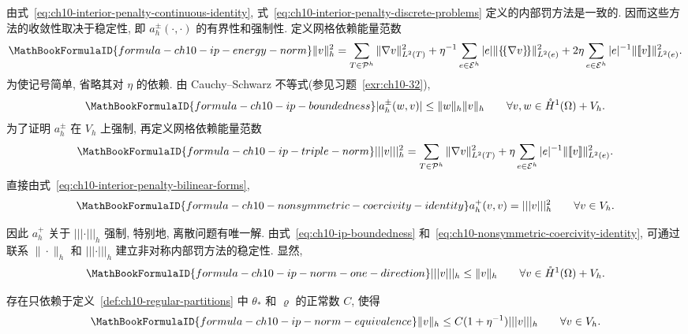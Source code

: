 由式~\eqref{eq:ch10-interior-penalty-continuous-identity}, 式~\eqref{eq:ch10-interior-penalty-discrete-problems} 定义的内部罚方法是一致的. 因而这些方法的收敛性取决于稳定性, 即 $a_h^\pm(\cdot,\cdot)$ 的有界性和强制性. 定义网格依赖能量范数
\begin{equation}
\MathBookFormulaID{formula-ch10-ip-energy-norm}
\label{eq:ch10-ip-energy-norm}
\|v\|_h^2
=\sum_{T\in\mathcal P^h}\|\nabla v\|_{L^2(T)}^2
+\eta^{-1}\sum_{e\in\mathcal E^h}|e|\|\{\!\{\nabla v\}\!\}\|_{L^2(e)}^2
+2\eta\sum_{e\in\mathcal E^h}|e|^{-1}\|[\![v]\!]\|_{L^2(e)}^2.
\end{equation}
为使记号简单, 省略其对 $\eta$ 的依赖. 由 Cauchy--Schwarz 不等式(参见习题~\ref{exr:ch10-32}),
\begin{equation}
\MathBookFormulaID{formula-ch10-ip-boundedness}
\label{eq:ch10-ip-boundedness}
|a_h^\pm(w,v)|\leq\|w\|_h\|v\|_h
\qquad\forall v,w\in\mathring H^1(\Omega)+V_h.
\end{equation}
为了证明 $a_h^\pm$ 在 $V_h$ 上强制, 再定义网格依赖能量范数
\begin{equation}
\MathBookFormulaID{formula-ch10-ip-triple-norm}
\label{eq:ch10-ip-triple-norm}
|||v|||_h^2
=\sum_{T\in\mathcal P^h}\|\nabla v\|_{L^2(T)}^2
+\eta\sum_{e\in\mathcal E^h}|e|^{-1}\|[\![v]\!]\|_{L^2(e)}^2.
\end{equation}
直接由式~\eqref{eq:ch10-interior-penalty-bilinear-forms},
\begin{equation}
\MathBookFormulaID{formula-ch10-nonsymmetric-coercivity-identity}
\label{eq:ch10-nonsymmetric-coercivity-identity}
a_h^+(v,v)=|||v|||_h^2\qquad\forall v\in V_h.
\end{equation}

因此 $a_h^+$ 关于 $|||\cdot|||_h$ 强制, 特别地, 离散问题有唯一解. 由式~\eqref{eq:ch10-ip-boundedness} 和~\eqref{eq:ch10-nonsymmetric-coercivity-identity}, 可通过联系 $\|\cdot\|_h$ 和 $|||\cdot|||_h$ 建立非对称内部罚方法的稳定性. 显然,
\begin{equation}
\MathBookFormulaID{formula-ch10-ip-norm-one-direction}
\label{eq:ch10-ip-norm-one-direction}
|||v|||_h\leq\|v\|_h
\qquad\forall v\in\mathring H^1(\Omega)+V_h.
\end{equation}

\begin{Lemma}
\label{lem:ch10-ip-norm-equivalence}
存在只依赖于定义~\ref{def:ch10-regular-partitions} 中 $\theta_*$ 和 $\varrho$ 的正常数 $C$, 使得
\begin{equation}
\MathBookFormulaID{formula-ch10-ip-norm-equivalence}
\label{eq:ch10-ip-norm-equivalence}
\|v\|_h\leq C(1+\eta^{-1})|||v|||_h
\qquad\forall v\in V_h.
\end{equation}
\end{Lemma}

